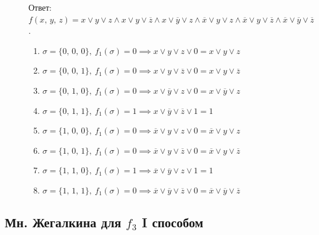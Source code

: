 \documentclass[12pt,a4paper]{article}
\theoremstyle{plain}
\theoremstyle{definition}
\theoremstyle{remark}
\numberwithin{equation}{section}
\begin{document}
\begin{figure}[H]
\begin{minipage}[t]{0.55\linewidth}
    \vspace{0.5em}
    \noindent Ответ: $f(x,\,y,\,z) = x \lor y \lor z \land x \lor y \lor \overline{z} \land x\lor \overline{y} \lor z \land \overline{x} \lor y \lor z \land \overline{x} \lor y \lor \overline{z} \land \overline{x} \lor \overline y \lor \overline z$.
  \end{minipage} \hfill
  \begin{minipage}[t]{0.46\linewidth}
    \vspace{0em}
    \begin{enumerate}
      \item $\sigma = \{0,\,0,\,0\},\ f_1(\sigma) = 0 \implies x \lor y \lor z \lor 0 = x \lor y \lor z$
      \item $\sigma = \{0,\,0,\,1\},\ f_1(\sigma) = 0 \implies x \lor y \lor \overline{z} \lor 0 = x \lor y \lor \overline{z}$
      \item $\sigma = \{0,\,1,\,0\},\ f_1(\sigma) = 0 \implies x\lor \overline{y} \lor z \lor 0 = x\lor \overline{y} \lor z$
      \item $\sigma = \{0,\,1,\,1\},\ f_1(\sigma) = 1 \implies x \lor \overline{y} \lor \overline z \lor 1 = 1$
      \item $\sigma = \{1,\,0,\,0\},\ f_1(\sigma) = 0 \implies \overline{x} \lor y \lor z \lor 0 = \overline{x} \lor y \lor z$
      \item $\sigma = \{1,\,0,\,1\},\ f_1(\sigma) = 0 \implies \overline{x} \lor y \lor \overline{z} \lor 0 = \overline{x} \lor y \lor \overline{z}$
      \item $\sigma = \{1,\,1,\,0\},\ f_1(\sigma) = 1 \implies \overline{x} \lor \overline{y} \lor z \lor 1 = 1$
      \item $\sigma = \{1,\,1,\,1\},\ f_1(\sigma) = 0 \implies \overline{x} \lor \overline y \lor \overline z \lor 0 = \overline{x} \lor \overline y \lor \overline z$
    \end{enumerate}
  \end{minipage}
\end{figure}

\subsection{Мн. Жегалкина для $f_3$ I способом}
\end{document}
